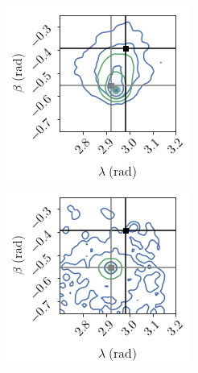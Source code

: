 \documentclass[aps,showpacs,twocolumn,prd,superscriptaddress,nofootinbib]{revtex4-1}
\begin{document}
\begin{figure}
  \centering
  \begin{minipage}{.49\linewidth}
  \includegraphics[width=.99\linewidth]{../plots/corner_skydown_smbh_case9_22_ptmcmc_bambi_withdegen.png}
  \end{minipage}
  \begin{minipage}{.49\linewidth}
  \includegraphics[width=.99\linewidth]{../plots/corner_skydown_smbh_case9_simplelike_ptmcmc_bambi_withdegen.png}

\end{minipage}
\end{figure}
\end{document}
